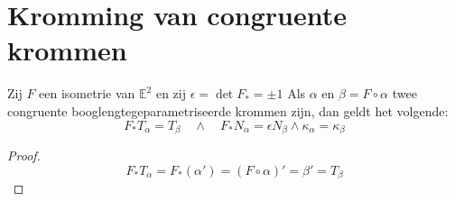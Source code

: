 \documentclass[main.tex]{subfiles}
\begin{document}
\section{Kromming van congruente krommen}
\label{sec:kromm-van-congr}

\begin{st}
  Zij $F$ een isometrie van $\mathbb{E}^{2}$ en zij $\epsilon = \det F_{*} = \pm 1$
  Als $\alpha$ en $\beta = F \circ \alpha$ twee congruente booglengtegeparametriseerde krommen zijn, dan geldt het volgende:
  \[ F_{*}T_{\alpha} = T_{\beta} \quad\wedge\quad F_{*}N_{\alpha} = \epsilon N_{\beta} \wedge \kappa_{\alpha} = \kappa_{\beta} \]

  \begin{proof}
    \[ F_{*}T_{\alpha} = F_{*}(\alpha') = (F \circ \alpha)' = \beta' = T_{\beta} \]
  \end{proof}
\end{st}
\end{document}
